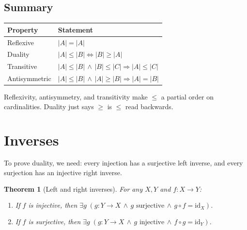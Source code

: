\documentclass[11pt]{article}
\theoremstyle{defstyle}
\theoremstyle{thmstyle}
\newtheorem{theorem}{Theorem}[section]
\theoremstyle{notstyle}
\theoremstyle{cautionstyle}
\newcommand{\card}[1]{\lvert #1 \rvert}
\begin{document}
\subsection*{Summary}

\begin{center}
\renewcommand{\arraystretch}{1.4}
\begin{tabular}{|l|l|}
\hline
\textbf{Property} & \textbf{Statement} \\
\hline
Reflexive     & $\card{A} = \card{A}$ \\
Duality       & $\card{A} \leq \card{B} \iff \card{B} \geq \card{A}$ \\
Transitive    & $\card{A} \leq \card{B} \,\land\, \card{B} \leq \card{C} \Rightarrow \card{A} \leq \card{C}$ \\
Antisymmetric & $\card{A} \leq \card{B} \,\land\, \card{A} \geq \card{B} \Rightarrow \card{A} = \card{B}$ \\
\hline
\end{tabular}
\end{center}

Reflexivity, antisymmetry, and transitivity make $\leq$ a partial order on
cardinalities. Duality just says $\geq$ is $\leq$ read backwards.

\section{Inverses}

To prove duality, we need: every injection has a surjective left inverse, and
every surjection has an injective right inverse.

\begin{thmbox}
\begin{theorem}[Left and right inverses]
For any $X, Y$ and $f : X \to Y$:
\begin{enumerate}[label=\textnormal{(\Roman*)}, leftmargin=2.5em, itemsep=2pt]
  \item If $f$ is injective, then $\exists g \;(g : Y \to X \,\land\, g \text{ surjective} \,\land\, g \circ f = \mathrm{id}_X)$.
  \item If $f$ is surjective, then $\exists g \;(g : Y \to X \,\land\, g \text{ injective} \,\land\, f \circ g = \mathrm{id}_Y)$.
\end{enumerate}
\end{theorem}
\end{thmbox}
\end{document}
